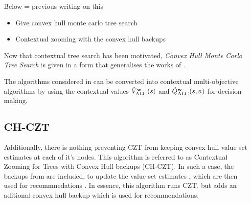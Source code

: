 





    Below = previous writing on this

    \begin{itemize}
        \item Give convex hull monte carlo tree search
        \item Contextual zooming with the convex hull backups
    \end{itemize}





    Now that contextual tree search has been motivated, \textit{Convex Hull Monte Carlo Tree Search} is given in a form that generalises the works of .







    The algorithms considered in  can be converted into contextual multi-objective algorithms by using the contextual values ${\hat{V}^{\mathbf{w}}_{{\textnormal{ALG}}}}(s)$ and ${\hat{Q}^{\mathbf{w}}_{{\textnormal{ALG}}}}(s,a)$ for decision making.







    \subsection{CH-CZT}
    \label{sec:5-3-1-chczt}



        Additionally, there is nothing preventing CZT from keeping convex hull value set estimates at each of it's nodes. This algorithm is referred to as Contextual Zooming for Trees with Convex Hull backups (CH-CZT). In such a case, the backups from  are included, to update the value set estimates , which are then used for recommnedations . In essence, this algorithm runs CZT, but adds an aditional convex hull backup which is used for recommendations.






